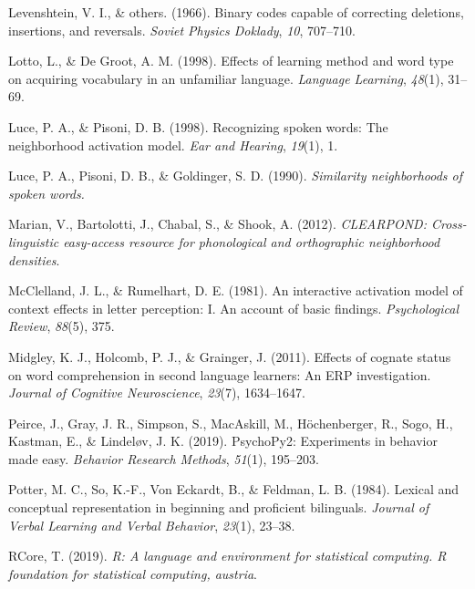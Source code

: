 \documentclass[
  english,
  man,floatsintext]{apa7}
\newlength{\cslhangindent}
\newenvironment{CSLReferences}[2] %
 {%
  \setlength{\parindent}{0pt}
  \ifodd #1 \everypar{\setlength{\hangindent}{\cslhangindent}}\ignorespaces\fi
  \ifnum #2 > 0
  \setlength{\parskip}{#2\baselineskip}
  \fi
 }%
 {}
\begin{document}
\begin{CSLReferences}{1}{0}
\leavevmode{}%
Levenshtein, V. I., \& others. (1966). Binary codes capable of correcting deletions, insertions, and reversals. \emph{Soviet Physics Doklady}, \emph{10}, 707--710.

\leavevmode{}%
Lotto, L., \& De Groot, A. M. (1998). Effects of learning method and word type on acquiring vocabulary in an unfamiliar language. \emph{Language Learning}, \emph{48}(1), 31--69.

\leavevmode{}%
Luce, P. A., \& Pisoni, D. B. (1998). Recognizing spoken words: The neighborhood activation model. \emph{Ear and Hearing}, \emph{19}(1), 1.

\leavevmode{}%
Luce, P. A., Pisoni, D. B., \& Goldinger, S. D. (1990). \emph{Similarity neighborhoods of spoken words.}

\leavevmode{}%
Marian, V., Bartolotti, J., Chabal, S., \& Shook, A. (2012). \emph{CLEARPOND: Cross-linguistic easy-access resource for phonological and orthographic neighborhood densities}.

\leavevmode{}%
McClelland, J. L., \& Rumelhart, D. E. (1981). An interactive activation model of context effects in letter perception: I. An account of basic findings. \emph{Psychological Review}, \emph{88}(5), 375.

\leavevmode{}%
Midgley, K. J., Holcomb, P. J., \& Grainger, J. (2011). Effects of cognate status on word comprehension in second language learners: An ERP investigation. \emph{Journal of Cognitive Neuroscience}, \emph{23}(7), 1634--1647.

\leavevmode{}%
Peirce, J., Gray, J. R., Simpson, S., MacAskill, M., Höchenberger, R., Sogo, H., Kastman, E., \& Lindeløv, J. K. (2019). PsychoPy2: Experiments in behavior made easy. \emph{Behavior Research Methods}, \emph{51}(1), 195--203.

\leavevmode{}%
Potter, M. C., So, K.-F., Von Eckardt, B., \& Feldman, L. B. (1984). Lexical and conceptual representation in beginning and proficient bilinguals. \emph{Journal of Verbal Learning and Verbal Behavior}, \emph{23}(1), 23--38.

\leavevmode{}%
RCore, T. (2019). \emph{R: A language and environment for statistical computing. R foundation for statistical computing, austria}.


\end{CSLReferences}
\end{document}
